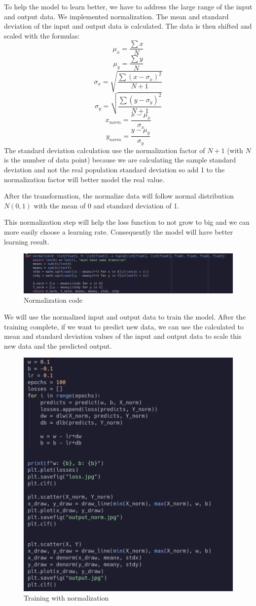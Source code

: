 \documentclass{article}
\begin{document}
To help the model to learn better, we have to address the large range of the input and output data. We implemented normalization. The mean and standard deviation of the input and output data is calculated. The data is then shifted and scaled with the formulas:
\[\mu_x = \frac{\sum x}{N}\]
\[\mu_y = \frac{\sum y}{N}\]
\[\sigma_x = \sqrt{\frac{\sum (x - \sigma_x)^2}{N + 1}}\]
\[\sigma_y = \sqrt{\frac{\sum (y - \sigma_y)^2}{N + 1}}\]
\[x_{norm} = \frac{x - \mu_x}{\sigma_x}\]
\[y_{norm} = \frac{y - \mu_y}{\sigma_y}\]
The standard deviation calculation use the normalization factor of \(N + 1\) (with \(N\) is the number of data point) because we are calculating the sample standard deviation and not the real population standard deviation so add 1 to the normalization factor will better model the real value.

After the transformation, the normalize data will follow normal distribution \(N(0, 1)\) with the mean of 0 and standard deviation of 1.

This normalization step will help the loss function to not grow to big and we can more easily choose a learning rate. Consequently the model will have better learning result.

\begin{figure}[H]
    \centering
    \includegraphics[width=0.75\linewidth]{normallize.png}
    \caption{Normalization code}
    \label{fig:enter-label}
\end{figure}

We will use the normalized input and output data to train the model. After the training complete, if we want to predict new data, we can use the calculated to mean and standard deviation values of the input and output data to scale this new data and the predicted output.

\begin{figure}[H]
    \centering
    \includegraphics[width=0.6\linewidth]{training_norm.png}
    \caption{Training with normalization}
    \label{fig:enter-label}
\end{figure}
\end{document}
